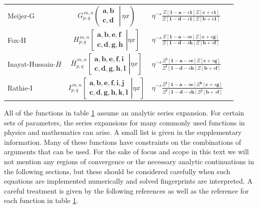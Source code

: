 \documentclass{article}
\begin{document}
\begin{table}
\begin{tabular}{|p{2.3cm}|c|p{3.5cm}|c|}
\hline
Meijer-G & $G_{p,q}^{\,m,n} \!\left( \left. \begin{matrix} \mathbf{a,b} \\ \mathbf{c,d} \end{matrix} \; \right| \, \eta x \right)$ & $\eta^{-s}\frac{ \Xi[\mathbf{1}-\mathbf{a}-s\mathbf{1}]\Xi[\mathbf{c}+s\mathbf{1}]} {\Xi[\mathbf{1}-\mathbf{d}-s\mathbf{1}]\Xi[\mathbf{b}+s\mathbf{1}]}$& \cite{Bateman1953,Mainardi2003}\\
Fox-H & $H_{p,q}^{\,m,n} \!\left[\left. \begin{matrix}
\mathbf{a},\mathbf{b},\mathbf{e,f} \\
\mathbf{c},\mathbf{d},\mathbf{g,h} \end{matrix} \right| \eta x \right]$ & $\eta^{-s}\frac{\Xi[\mathbf{1-a}-s\mathbf{e}]\Xi[\mathbf{c}+s\mathbf{g}]}{\Xi[\mathbf{1-d}-s\mathbf{h}] \Xi[\mathbf{b} + s \mathbf{f}]}$ & \cite{Fox1961,Rathie2018}\\
Inayat-Hussain-$\bar{H}$  & $\bar{H}_{p,q}^{\,m,n} \!\left[\left. \begin{matrix}
\mathbf{a},\mathbf{b},\mathbf{e,f,i} \\
\mathbf{c},\mathbf{d},\mathbf{g,h,l} \end{matrix} \right| \eta x \right]$ & $\eta^{-s}\frac{\Xi^{\mathbf{i}}[\mathbf{1-a}-s\mathbf{e}]\Xi[\mathbf{c}+s\mathbf{g}]}{\Xi^{\mathbf{l}}[\mathbf{1-d}-s\mathbf{h}] \Xi[\mathbf{b} + s \mathbf{f}]}$ & \cite{Inayat-Hussain1987}\\
Rathie-I & $I_{p,q}^{\,m,n} \!\left[\left. \begin{matrix}
\mathbf{a},\mathbf{b},\mathbf{e,f,i,j} \\
\mathbf{c},\mathbf{d},\mathbf{g,h,k,l} \end{matrix} \right| \eta x \right]$ & $\eta^{-s}\frac{\Xi^{\mathbf{i}}[\mathbf{1-a}-s\mathbf{e}]\Xi^{\mathbf{k}}[\mathbf{c}+s\mathbf{g}]}{\Xi^{\mathbf{l}}[\mathbf{1-d}-s\mathbf{h}] \Xi^{\mathbf{j}}[\mathbf{b} + s \mathbf{f}]}$ & \cite{Rathie1997}\\
\hline
\end{tabular}
\label{tab:main}
\end{table}

All of the functions in table \ref{tab:main} assume an analytic series expansion. For certain sets of parameters, the series expansions for many commonly used functions in physics and mathematics can arise. A small list is given in the supplementary information. Many of these functions have constraints on the combinations of arguments that can be used. For the sake of focus and scope in this text we will not mention any regions of convergence or the necessary analytic continuations in the following sections, but these should be considered carefully when such equations are implemented numerically and solved fingerprints are interpreted. A careful treatment is given by the following references \cite{Geenens2017,Passare1996,Peasgood2009} as well as the reference for each function in table \ref{tab:main}.\\
\end{document}
